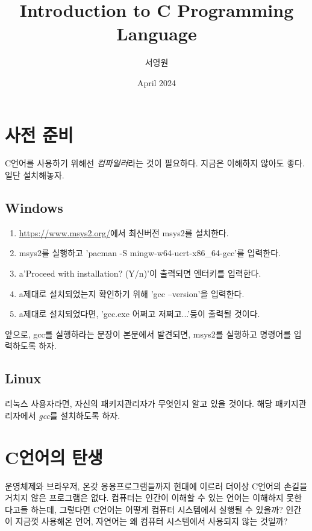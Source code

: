 \documentclass{article}
\title{Introduction to C Programming Language}
\author{서영원}
\date{April 2024}
\begin{document}
\maketitle

\tableofcontents

\vfill
\doclicenseThis


\pagebreak

\section{사전 준비}

C언어를 사용하기 위해선 \textit{컴파일러}라는 것이 필요하다.
지금은 이해하지 않아도 좋다. 일단 설치해놓자.

\subsection{Windows}

\begin{enumerate}
    \item \url{https://www.msys2.org/}에서 최신버전 msys2를 설치한다.
    \item msys2를 실행하고 'pacman -S mingw-w64-ucrt-x86\_64-gcc'를 입력한다.
    \item a'Proceed with installation? (Y/n)'이 출력되면 엔터키를 입력한다.
    \item a제대로 설치되었는지 확인하기 위해 'gcc --version'을 입력한다.
    \item a제대로 설치되었다면, 'gcc.exe 어쩌고 저쩌고...'등이 출력될 것이다.
\end{enumerate}

앞으로, gcc를 실행하라는 문장이 본문에서 발견되면, msys2를 실행하고 명령어를 입력하도록 하자.

\subsection{Linux}

리눅스 사용자라면, 자신의 패키지관리자가 무엇인지 알고 있을 것이다.
해당 패키지관리자에서 \textit{gcc}를 설치하도록 하자.

\section{C언어의 탄생}

운영체제와 브라우저, 온갖 응용프로그램들까지 현대에 이르러 더이상
C언어의 손길을 거치지 않은 프로그램은 없다.
컴퓨터는 인간이 이해할 수 있는 언어는 이해하지 못한다고들 하는데,
그렇다면 C언어는 어떻게 컴퓨터 시스템에서 실행될 수 있을까?
인간이 지금껏 사용해온 언어, 자연어는 왜 컴퓨터 시스템에서 사용되지 않는
것일까?
\end{document}
